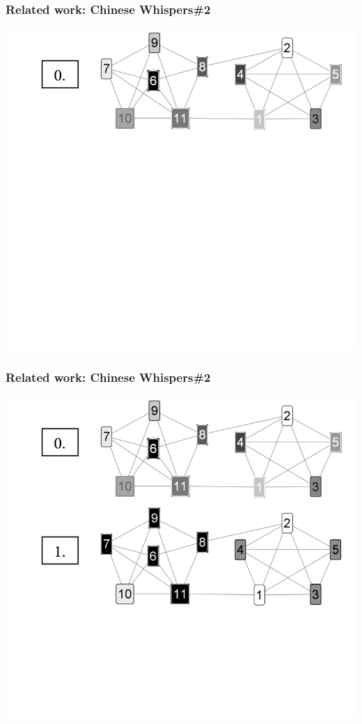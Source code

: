 \begin{frame}[fragile]
\frametitle{Related work: Chinese Whispers\#2}
\begin{center}
 \includegraphics[height=0.59\textwidth]{figures/cw2-1}
 
 \end{center}
\end{frame}


\begin{frame}[fragile]
\frametitle{Related work: Chinese Whispers\#2}
\begin{center}
 \includegraphics[height=0.59\textwidth]{figures/cw2-2}
 
 \end{center}
\end{frame}

